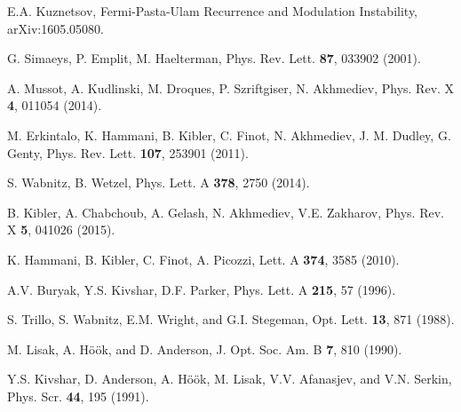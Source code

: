 \documentclass[pra,twocolumn,showpacs,preprintnumbers,amsmath,amssymb]{revtex4}
\begin{document}
\begin{thebibliography}{99}
E.A. Kuznetsov,
Fermi-Pasta-Ulam Recurrence and Modulation Instability, 
arXiv:1605.05080.

G. Simaeys, P. Emplit, M. Haelterman, 
Phys. Rev. Lett. {\bf 87}, 033902 (2001).

A. Mussot, A. Kudlinski, M. Droques, P. Szriftgiser, N. Akhmediev, 
Phys. Rev. X {\bf 4}, 011054 (2014).

M. Erkintalo, K. Hammani, B. Kibler, C. Finot, N. Akhmediev, J. M. Dudley, G. Genty,
Phys. Rev. Lett. {\bf 107}, 253901 (2011).


S. Wabnitz, B. Wetzel,
Phys. Lett. A  {\bf 378}, 2750 (2014).

B. Kibler, A. Chabchoub, A. Gelash, N. Akhmediev, V.E. Zakharov,
Phys. Rev. X {\bf 5}, 041026 (2015).

K. Hammani, B. Kibler, C. Finot, A. Picozzi,
Lett. A {\bf 374}, 3585 (2010).

A.V. Buryak, Y.S. Kivshar, D.F. Parker,
Phys. Lett. A \textbf{215}, 57 (1996).

S. Trillo, S. Wabnitz, E.M. Wright, and G.I. Stegeman,
Opt. Lett. \textbf{13}, 871 (1988).

M. Lisak, A. H\"o\"ok, and D. Anderson,
J. Opt. Soc. Am. B \textbf{7}, 810 (1990).

Y.S. Kivshar, D. Anderson, A. H\"o\"ok, M. Lisak, V.V. Afanasjev, and V.N. Serkin, Phys. Scr. \textbf{44}, 195 (1991).



\end{thebibliography}
\end{document}
